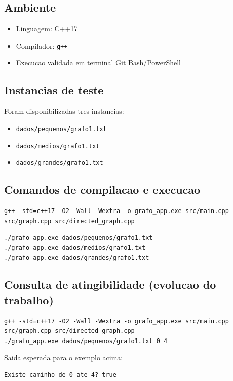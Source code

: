 \documentclass[12pt,a4paper]{article}
\begin{document}
\subsection{Ambiente}
\begin{itemize}
    \item Linguagem: C++17
    \item Compilador: \texttt{g++}
    \item Execucao validada em terminal Git Bash/PowerShell
\end{itemize}

\subsection{Instancias de teste}
Foram disponibilizadas tres instancias:
\begin{itemize}
    \item \texttt{dados/pequenos/grafo1.txt}
    \item \texttt{dados/medios/grafo1.txt}
    \item \texttt{dados/grandes/grafo1.txt}
\end{itemize}

\subsection{Comandos de compilacao e execucao}
\begin{lstlisting}[style=cppstyle]
g++ -std=c++17 -O2 -Wall -Wextra -o grafo_app.exe src/main.cpp src/graph.cpp src/directed_graph.cpp
\end{lstlisting}

\begin{lstlisting}[style=cppstyle]
./grafo_app.exe dados/pequenos/grafo1.txt
./grafo_app.exe dados/medios/grafo1.txt
./grafo_app.exe dados/grandes/grafo1.txt
\end{lstlisting}

\subsection{Consulta de atingibilidade (evolucao do trabalho)}
\begin{lstlisting}[style=cppstyle]
g++ -std=c++17 -O2 -Wall -Wextra -o grafo_app.exe src/main.cpp src/graph.cpp src/directed_graph.cpp
./grafo_app.exe dados/pequenos/grafo1.txt 0 4
\end{lstlisting}

Saida esperada para o exemplo acima:
\begin{verbatim}
Existe caminho de 0 ate 4? true
\end{verbatim}
\end{document}
